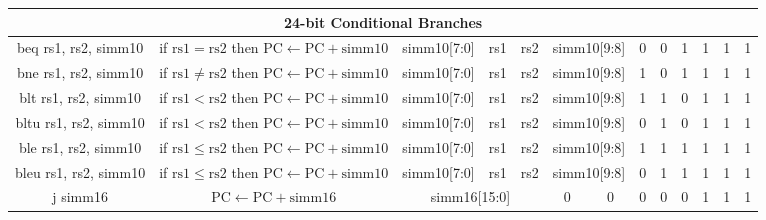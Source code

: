\documentclass[a4paper,10pt]{article}
\begin{document}
\begin{landscape}
\begin{longtable}[c]{|c|c|@{}c@{}|@{}c@{}|@{}c@{}|@{}c@{}|@{}c@{}|@{}c@{}|@{}c@{}|@{}c@{}|@{}c@{}|@{}c@{}|@{}c@{}|@{}c@{}|@{}c@{}|@{}c@{}|@{}c@{}|@{}c@{}|@{}c@{}|@{}c@{}|@{}c@{}|@{}c@{}|@{}c@{}|@{}c@{}|@{}c@{}|@{}c@{}|}
\hline
\multicolumn{26}{|c|}{24-bit Conditional Branches}                                                                                                                                                                                                                                                             \\\hline
beq rs1, rs2, simm10  & if $\mathrm{rs1} = \mathrm{rs2}$ then $\mathrm{PC} \leftarrow \mathrm{PC} + \mathrm{simm10}$ & \multicolumn{8}{c|}{simm10{[}7:0{]}}                        & \multicolumn{4}{c|}{rs1}            & \multicolumn{4}{c|}{rs2}     & \multicolumn{2}{c|}{simm10{[}9:8{]}} & 0   & 0   & 1   & 1 & 1 & 1 \\
bne rs1, rs2, simm10  & if $\mathrm{rs1} \neq \mathrm{rs2}$ then $\mathrm{PC} \leftarrow \mathrm{PC} + \mathrm{simm10}$ & \multicolumn{8}{c|}{simm10{[}7:0{]}}                        & \multicolumn{4}{c|}{rs1}            & \multicolumn{4}{c|}{rs2}     & \multicolumn{2}{c|}{simm10{[}9:8{]}} & 1   & 0   & 1   & 1 & 1 & 1 \\
blt rs1, rs2, simm10  & if $\mathrm{rs1} < \mathrm{rs2}$ then $\mathrm{PC} \leftarrow \mathrm{PC} + \mathrm{simm10}$ & \multicolumn{8}{c|}{simm10{[}7:0{]}}                        & \multicolumn{4}{c|}{rs1}            & \multicolumn{4}{c|}{rs2}     & \multicolumn{2}{c|}{simm10{[}9:8{]}} & 1   & 1   & 0   & 1 & 1 & 1 \\
bltu rs1, rs2, simm10 & if $\mathrm{rs1} < \mathrm{rs2}$ then $\mathrm{PC} \leftarrow \mathrm{PC} + \mathrm{simm10}$ & \multicolumn{8}{c|}{simm10{[}7:0{]}}                        & \multicolumn{4}{c|}{rs1}            & \multicolumn{4}{c|}{rs2}     & \multicolumn{2}{c|}{simm10{[}9:8{]}} & 0   & 1   & 0   & 1 & 1 & 1 \\
ble rs1, rs2, simm10  & if $\mathrm{rs1} \le \mathrm{rs2}$ then $\mathrm{PC} \leftarrow \mathrm{PC} + \mathrm{simm10}$ & \multicolumn{8}{c|}{simm10{[}7:0{]}}                        & \multicolumn{4}{c|}{rs1}            & \multicolumn{4}{c|}{rs2}     & \multicolumn{2}{c|}{simm10{[}9:8{]}} & 1   & 1   & 1   & 1 & 1 & 1 \\
bleu rs1, rs2, simm10 & if $\mathrm{rs1} \le \mathrm{rs2}$ then $\mathrm{PC} \leftarrow \mathrm{PC} + \mathrm{simm10}$ & \multicolumn{8}{c|}{simm10{[}7:0{]}}                        & \multicolumn{4}{c|}{rs1}            & \multicolumn{4}{c|}{rs2}     & \multicolumn{2}{c|}{simm10{[}9:8{]}} & 0   & 1   & 1   & 1 & 1 & 1 \\
j simm16              & $\mathrm{PC} \leftarrow \mathrm{PC} + \mathrm{simm16}$ & \multicolumn{16}{c|}{simm16{[}15:0{]}}                                                                                         & 0              & 0              & 0 & 0   & 0   & 1 & 1 & 1 \\

\end{longtable}
\end{landscape}
\end{document}
